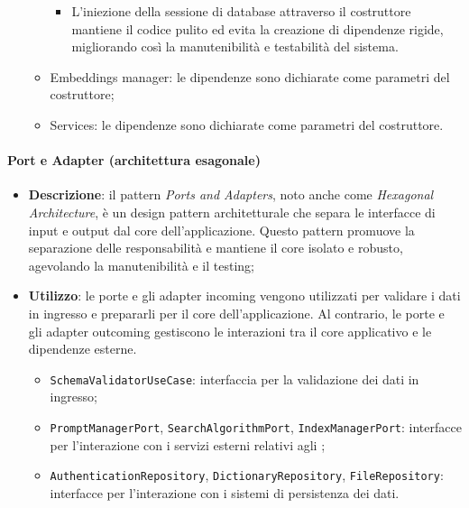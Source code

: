 \begin{itemize}
\begin{itemize}
\begin{itemize}
            \item L'iniezione della sessione di database attraverso il costruttore mantiene il codice pulito ed evita la creazione di dipendenze rigide, migliorando così la manutenibilità e testabilità del sistema.
        \end{itemize}
        \item Embeddings manager: le dipendenze sono dichiarate come parametri del costruttore;
        \item Services: le dipendenze sono dichiarate come parametri del costruttore.
    \end{itemize}
\end{itemize}

\paragraph{Port e Adapter (architettura esagonale)}
\begin{itemize}
    \item \textbf{Descrizione}: il pattern \textit{Ports and Adapters}, noto anche come \textit{Hexagonal Architecture}, è un design pattern architetturale che separa le interfacce di input e output dal core dell'applicazione. Questo pattern promuove la separazione delle responsabilità e mantiene il core isolato e robusto, agevolando la manutenibilità e il testing;
    \item \textbf{Utilizzo}: le porte e gli adapter incoming vengono utilizzati per validare i dati in ingresso e prepararli per il core dell'applicazione. Al contrario, le porte e gli adapter outcoming gestiscono le interazioni tra il core applicativo e le dipendenze esterne.
    \begin{itemize}
        \item \texttt{SchemaValidatorUseCase}: interfaccia per la validazione dei dati in ingresso;
        \item \texttt{PromptManagerPort}, \texttt{SearchAlgorithmPort}, \texttt{IndexManagerPort}: interfacce per l'interazione con i servizi esterni relativi agli ;
        \item \texttt{AuthenticationRepository}, \texttt{DictionaryRepository}, \texttt{FileRepository}: interfacce per l'interazione con i sistemi di persistenza dei dati.
    \end{itemize}
\end{itemize}

